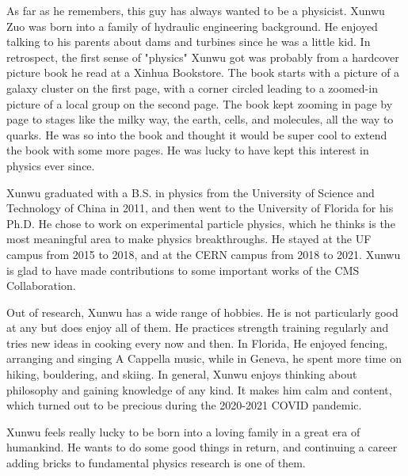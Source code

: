 \justify

\hspace{2em} As far as he remembers, this guy has always wanted to be a physicist.
Xunwu Zuo was born into a family of hydraulic engineering background.
He enjoyed talking to his parents about dams and turbines since he was a little kid.
In retrospect, the first sense of "physics" Xunwu got was probably from a hardcover picture book he read at a Xinhua Bookstore.
The book starts with a picture of a galaxy cluster on the first page, 
with a corner circled leading to a zoomed-in picture of a local group on the second page.
The book kept zooming in page by page to stages like the milky way, the earth, cells, and molecules, all the way to quarks.
He was so into the book and thought it would be super cool to extend the book with some more pages.
He was lucky to have kept this interest in physics ever since.

Xunwu graduated with a B.S. in physics from the University of Science and Technology of China in 2011,
and then went to the University of Florida for his Ph.D.
He chose to work on experimental particle physics, 
which he thinks is the most meaningful area to make physics breakthroughs.
He stayed at the UF campus from 2015 to 2018, and at the CERN campus from 2018 to 2021.
Xunwu is glad to have made contributions to some important works of the CMS Collaboration.

Out of research, Xunwu has a wide range of hobbies.
He is not particularly good at any but does enjoy all of them.
He practices strength training regularly and tries new ideas in cooking every now and then.
In Florida, He enjoyed fencing, arranging and singing A Cappella music,
while in Geneva, he spent more time on hiking, bouldering, and skiing.
In general, Xunwu enjoys thinking about philosophy and gaining knowledge of any kind.
It makes him calm and content, which turned out to be precious during the 2020-2021 COVID pandemic.

Xunwu feels really lucky to be born into a loving family in a great era of humankind.
He wants to do some good things in return,
and continuing a career adding bricks to fundamental physics research is one of them.